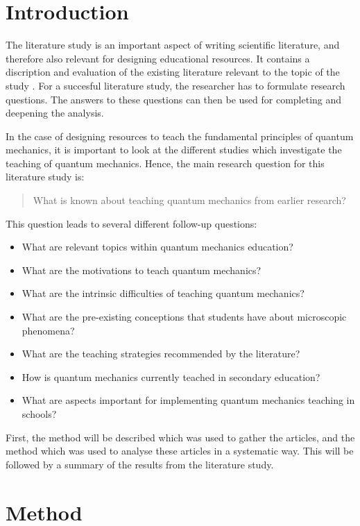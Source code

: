\documentclass[11pt,twoside]{report} %
\begin{document}
\section{Introduction}

The literature study is an important aspect of writing scientific literature, and therefore also relevant for designing educational resources. It contains a discription and evaluation of the existing literature relevant to the topic of the study \cite{lerencomm}. For a succesful literature study, the researcher has to formulate research questions. The answers to these questions can then be used for completing and deepening the analysis.

In the case of designing resources to teach the fundamental principles of quantum mechanics, it is important to look at the different studies which investigate the teaching of quantum mechanics. Hence, the main research question for this literature study is:

\begin{quote} What is known about teaching quantum mechanics from earlier research? \end{quote}
This question leads to several different follow-up questions:

\begin{itemize}
\item What are relevant topics within quantum mechanics education?
\item What are the motivations to teach quantum mechanics?
\item What are the intrinsic difficulties of teaching quantum mechanics?
\item What are the pre-existing conceptions that students have about microscopic phenomena?
\item What are the teaching strategies recommended by the literature?
\item How is quantum mechanics currently teached in secondary education?
\item What are aspects important for implementing quantum mechanics teaching in schools?
\end{itemize}

First, the method will be described which was used to gather the articles, and the method which was used to analyse these articles in a systematic way. This will be followed by a summary of the results from the literature study.

\section{Method}
\end{document}
